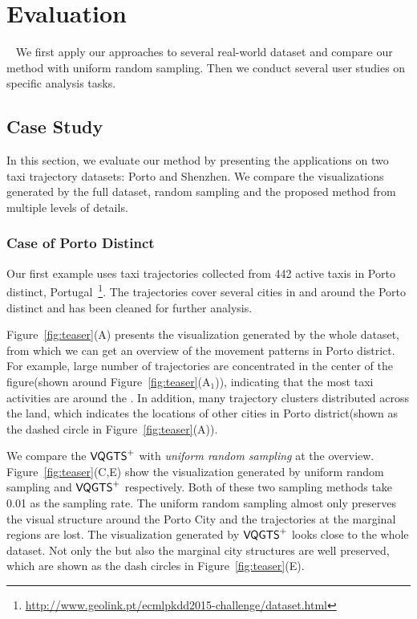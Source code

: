 \section{Evaluation}~\label{sec:exp}
We first apply our approaches to several real-world dataset and compare our method with uniform random sampling. Then we conduct several user studies on specific analysis tasks. 
\subsection{Case Study}
In this section, we evaluate our method by presenting the applications on two taxi trajectory datasets: Porto and Shenzhen. We compare the visualizations generated by the full dataset, random sampling and the proposed method from multiple levels of details. 
\subsubsection{Case of Porto Distinct}
Our first example uses taxi trajectories collected from 442 active taxis in Porto distinct, Portugal~\footnote{\url{http://www.geolink.pt/ecmlpkdd2015-challenge/dataset.html}}. The trajectories cover several cities in and around the Porto distinct and has been cleaned for further analysis.


Figure~\ref{fig:teaser}(A) presents the visualization generated by the whole dataset, from which we can get an overview of the movement patterns in Porto district. For example, large number of trajectories are concentrated in the center of the figure(shown around Figure~\ref{fig:teaser}(A$_1$)), indicating that the most taxi activities are around the . In addition, 
many trajectory clusters distributed across the land, which indicates the locations of other cities in Porto district(shown as the dashed circle in Figure~\ref{fig:teaser}(A)). 

We compare the $\mathsf{VQGTS}^{+}$ with \textit{uniform random sampling} at the overview. 
Figure~\ref{fig:teaser}(C,E) show the visualization generated by uniform random sampling and $\mathsf{VQGTS}^{+}$ respectively. Both of these two sampling methods take 0.01 as the sampling rate. The uniform random sampling almost only preserves the visual structure around the Porto City and the trajectories at the marginal regions are lost.
The visualization generated by $\mathsf{VQGTS}^{+}$ looks close to the whole dataset. Not only the  but also the marginal city structures are well preserved, which are shown as the dash circles in Figure~\ref{fig:teaser}(E).
 
